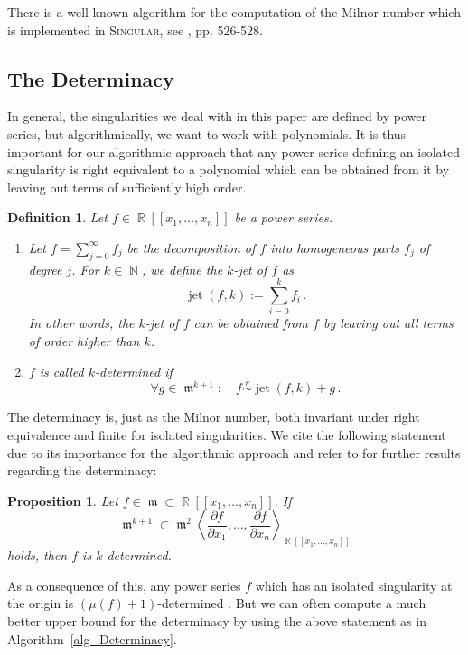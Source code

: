 \documentclass[noend]{amsproc}
\newtheorem{defn}[theorem]{Definition}
\newtheorem{prop}[theorem]{Proposition}
\theoremstyle{definition}
\newcommand{\Singular}{\textsc{Singular}}
\newcommand{\requiv}{\ensuremath{\mathrel{\overset{r}{\sim}}}}
\DeclareMathOperator{\m}{\mathfrak{m}}
\DeclareMathOperator{\jet}{jet}
\DeclareMathOperator{\N}{\mathbb{N}}
\DeclareMathOperator{\R}{\mathbb{R}}
\begin{document}
There is a well-known algorithm for the computation of the Milnor number which
is implemented in \Singular{}, see \citet{GP2008}, pp. 526-528.


\subsection{The Determinacy}%
\label{subsec:determinacy}

In general, the singularities we deal with in this paper are defined by power
series, but algorithmically, we want to work with polynomials. It is thus
important for our algorithmic approach that any power series defining an
isolated singularity is right equivalent to a polynomial which can be obtained
from it by leaving out terms of sufficiently high order.

\begin{defn}
Let $f \in \R[[x_1,\ldots,x_n]]$ be a power series.

\begin{enumerate}
\item Let $f = \sum_{j=0}^\infty f_j$ be the decomposition of $f$ into
homogeneous parts $f_j$ of degree $j$.
For $k \in \N$, we define the \emph{$k$-jet} of $f$ as
\[
\jet(f,k) := \sum_{i=0}^k f_i \,.
\]
In other words, the $k$-jet of $f$ can be obtained from $f$ by leaving out all
terms of order higher than $k$.

\item $f$ is called \emph{$k$-determined} if
\[
\forall g \in \m^{k+1}: \quad f \requiv \jet(f,k)+g \,.
\]
\end{enumerate}
\end{defn}

The determinacy is, just as the Milnor number, both invariant under right
equivalence and finite for isolated singularities. We cite the following
statement \citep[cf.\@][Chapter~I, Supplement to Theorem~2.23]{GLS2007} due to
its importance for the algorithmic approach and refer to \citet{GLS2007} for
further results regarding the determinacy:

\begin{prop}\label{prop_determinacy}
Let $f \in \m \subset \R[[x_1,\ldots,x_n]]$. If
\[
\m^{k+1} \subset \m^2 \left\langle \frac{\partial f}{\partial x_1}, \ldots,
\frac{\partial f}{\partial x_n} \right\rangle_{\R[[x_1,\ldots,x_n]]}
\]
holds, then $f$ is $k$-determined.
\end{prop}

As a consequence of this, any power series $f$ which has an isolated
singularity at the origin is $(\mu(f)+1)$-determined
\citep[cf.\@][Chapter~I, Corollary~2.24]{GLS2007}.
But we can often compute a much better upper bound for the
determinacy by using the above statement as in Algorithm~\ref{alg_Determinacy}.
\end{document}
